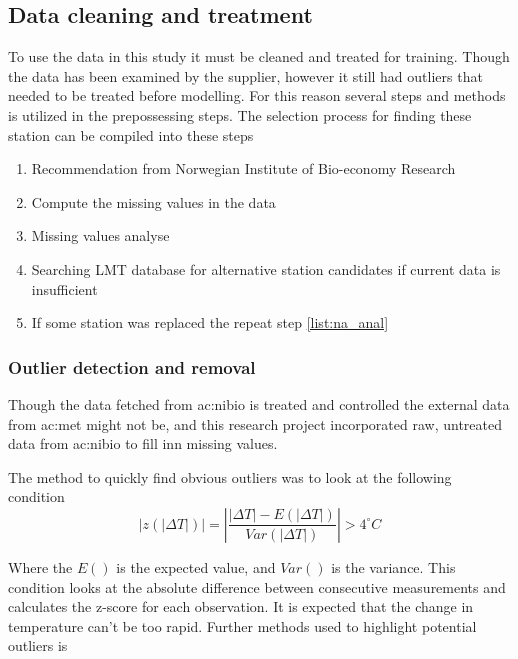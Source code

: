\subsection{Data cleaning and treatment}

To use the data in this study it must be cleaned and treated for training. Though the data has been examined by the supplier, however it still had outliers that needed to be treated before modelling. For this reason several steps and methods is utilized in the prepossessing steps. The selection process for finding these station can be compiled into these steps

\begin{enumerate}
	\item Recommendation from Norwegian Institute of Bio-economy Research
	\item \label{list:na_anal}Compute the missing values in the data
	\item Missing values analyse 
	\item Searching LMT database for alternative station candidates if current data is insufficient
	\item If some station was replaced the repeat step \ref{list:na_anal}
\end{enumerate}

\subsubsection{Outlier detection and removal}\label{sec:method:outlier}

Though the data fetched from \acrshort{ac:nibio} is treated and controlled the external data from \acrshort{ac:met} might not be, and this research project incorporated raw, untreated data from \acrshort{ac:nibio} to fill inn missing values.

The method to quickly find obvious outliers was to look at the following condition
\begin{equation}
	|z(|\Delta T|)| = \left|\frac{|\Delta T|-E(|\Delta T|)}{Var(|\Delta T|)}\right|> 4^\circ C
\end{equation}

Where the $E()$ is the expected value, and $Var()$ is the variance. This condition looks at the absolute difference between consecutive measurements and calculates the z-score for each observation. It is expected that the change in temperature can't be too rapid. Further methods used to highlight potential outliers is 

